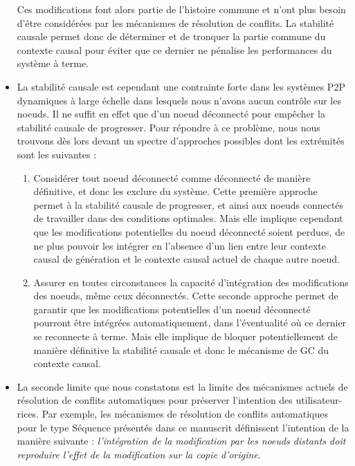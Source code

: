 \begin{itemize}
        Ces modifications font alors partie de l'histoire commune et n'ont plus besoin d'être considérées par les mécanismes de résolution de conflits.
        La stabilité causale permet donc de déterminer et de tronquer la partie commune du contexte causal pour éviter que ce dernier ne pénalise les performances du système à terme.
    \item La stabilité causale est cependant une contrainte forte dans les systèmes \ac{P2P} dynamiques à large échelle dans lesquels nous n'avons aucun contrôle sur les noeuds.
        Il ne suffit en effet que d'un noeud déconnecté pour empêcher la stabilité causale de progresser.
        Pour répondre à ce problème, nous nous trouvons dès lors devant un spectre d'approches possibles dont les extrémités sont les suivantes :
        \begin{enumerate}
            \item Considérer tout noeud déconnecté comme déconnecté de manière définitive, et donc les exclure du système.
                Cette première approche permet à la stabilité causale de progresser, et ainsi aux noeuds connectés de travailler dans des conditions optimales.
                Mais elle implique cependant que les modifications potentielles du noeud déconnecté soient perdues, \ie de ne plus pouvoir les intégrer en l'absence d'un lien entre leur contexte causal de génération et le contexte causal actuel de chaque autre noeud.
            \item Assurer en toutes circonstances la capacité d'intégration des modifications des noeuds, même ceux déconnectés.
                Cette seconde approche permet de garantir que les modifications potentielles d'un noeud déconnecté pourront être intégrées automatiquement, dans l'éventualité où ce dernier se reconnecte à terme.
                Mais elle implique de bloquer potentiellement de manière définitive la stabilité causale et donc le mécanisme de \ac{GC} du contexte causal.
        \end{enumerate}
    \item La seconde limite que nous constatons est la limite des mécanismes actuels de résolution de conflits automatiques pour préserver l'intention des utilisateur-rices.
        Par exemple, les mécanismes de résolution de conflits automatiques pour le type Séquence présentés dans ce manuscrit  définissent l'intention de la manière suivante : \emph{l'intégration de la modification par les noeuds distants doit reproduire l'effet de la modification sur la copie d'origine}.

\end{itemize}
